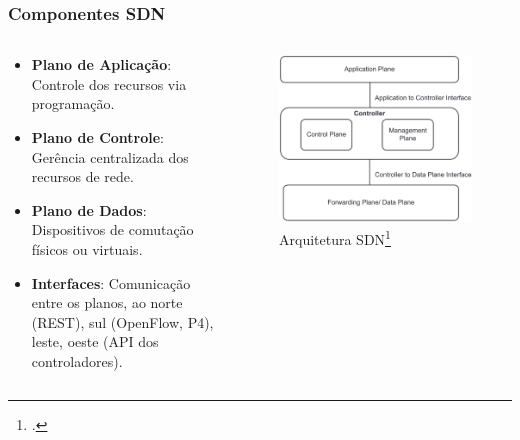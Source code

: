 \begin{frame}
    \frametitle{Componentes SDN}
    \begin{columns}
        \begin{column}{0.55\textwidth}
            \begin{itemize}
                \item \textbf{Plano de Aplicação}: Controle dos recursos via programação.
                \item \textbf{Plano de Controle}: Gerência centralizada dos recursos de rede.
                \item \textbf{Plano de Dados}: Dispositivos de comutação físicos ou virtuais.
                \item \textbf{Interfaces}: Comunicação entre os planos, ao norte (REST), sul (OpenFlow, P4), leste, oeste (API dos controladores).
        \end{itemize}            
        \end{column}
        \begin{column}{0.45\textwidth}
            \vspace{1cm}
            \begin{figure}[h]
                \centering
                \includegraphics[width=\textwidth]{figs/SDN_arquitetura.png}
                \caption{Arquitetura SDN\footcite{Recommended_SDN_Wireless}}
            \end{figure}
        \end{column}
    \end{columns}
\end{frame}

